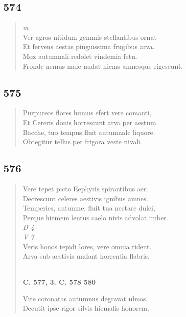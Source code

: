 \documentclass[11pt, a4paper]{report}
\begin{document}
            \subsection*{574}
      \begin{verse}
      \textit{m} \\ Ver agros nitidum gemmis stellantibus ornat \\ Et fervens aestas pinguissima frugibus arva. \\ Mox autumnali redolet vindemia fetu. \\ Fronde nemus male nudat hiems amnesque rigescunt. \\ 
      \end{verse}
  
            \subsection*{575}
      \begin{verse}
      Purpureos flores humus efert vere comanti, \\ Et Cereris donis horrescunt arva per aestum. \\ Bacche, tuo tempus fluit autumnale liquore. \\ Obtegitur tellus per frigora veste nivali. \\ 
      \end{verse}
  
            \subsection*{576}
      \begin{verse}
      Vere tepet picto Eephyris spirantibus aer. \\ Decrescunt celeres aestivis ignibus amnes. \\ Temperies, autumne, fluit tua nectare dulci, \\ Perque hiemem lentus caelo nivis advolat imber. \\ \textit{D 4} \\ \textit{V 7} \\ Veris honos tepidi lores, vere omuia rident. \\ Arva sub aestivis undant horrentia flabris. \\ 
        ﻿\pagebreak 
    \begin{center} \textbf{C. 577, 3. C. 578 580} \end{center} \marginpar{[79]} Vite coronatas autumnus degravat ulmos. \\ Decutit ipse rigor silvis hiemalis honorem. \\ 
      \end{verse}
  
\end{document}
